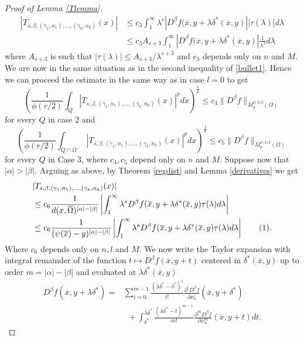\documentclass[12pt]{article}
\theoremstyle{definition}
\newcommand\addtag{\refstepcounter{equation}\tag{\theequation}}
\begin{document}
\begin{proof}[Proof of Lemma \ref{Tlemma}]
\begin{align*}
 |T_{s,\beta,(\gamma_1,n_1),...,(\gamma_k,n_k)}(x) | &\le c_3 \int_1^\infty\lambda^s |D^\beta f(\overline x, y+\lambda \delta^*(\overline x, y)| |\tau(\lambda)|d\lambda \\
&\le c_3A_{s+3} \int_1^\infty|D^\beta f(\overline x, y+\lambda \delta^*(\overline x, y)| \frac{1}{\lambda^3}d\lambda
\end{align*}
where  $A_{s+3}$ is such that $|\tau(\lambda)|\le A_{s+3}/\lambda^{s+3}$ and  $c_3$ depends only  on $n$ and $M.$ We are now in the same situation as in the second inequality of \eqref{bullet1}. Hence we can proceed the estimate in the same way as in case $l=0$ to get 
\[\left( \frac{1}{\phi(r/2)}\int_Q  \left| T_{s,\beta,(\gamma_1,n_1),...,(\gamma_k,n_k)}(x)\right|^p dx\right )^{\frac{1}{p}} \le c_4 \| D^\beta f \|_{M_p^{\phi,\delta/2}(\Omega)} \] 
for every $Q$ in case 2 and
\[\left( \frac{1}{\phi(r/2)}\int_{Q \cap \Omega^-}  \left| T_{s,\beta,(\gamma_1,n_1),...,(\gamma_k,n_k)}(x)\right|^p dx\right )^{\frac{1}{p}} \le c_5 \| D^\beta f \|_{M_p^{\phi,\delta/2}(\Omega)} \] 
 for every $Q$ in Case 3, where $c_4,c_5$ depend only on $n$ and $M.$
Suppose now that $|\alpha|>|\beta|.$ Arguing as above, by Theorem \ref{regdist} and Lemma \ref{derivatives} we get
\begin{align*}
&|T_{s,\beta,(\gamma_1,n_1),...,(\gamma_k,n_k)}(x) | \\
&\le c_6 \frac{1}{d(x,\overline \Omega)^{|\alpha|-|\beta|}} \left|\int_1^\infty \lambda^sD^\beta f(\overline x, y+\lambda \delta^*(\overline x, y)\tau(\lambda)d\lambda \right| \\
& \le  c_6 \frac{1}{(\psi(\overline x)-y)^{|\alpha|-|\beta|}} \left |\int_1^\infty \lambda^s D^\beta f(\overline x, y+\lambda \delta^*(\overline x, y) \tau(\lambda)d\lambda \right |\addtag \label{zzz} .   
\end{align*}
Where $c_6$ depends only on $n,l$ and $M$. We now write the Taylor expansion with integral remainder of the function $t \mapsto D^\beta f(\overline x, y+t)$ centered in $\delta^*(\overline x,y)$ up to order $m=|\alpha|-|\beta|$ and evaluated at $\lambda \delta^*(\overline x,y)$
\begin{align*}
D^\beta f(\overline x, y+\lambda \delta^*) = &\sum_{i=0}^{m-1} \frac{(\lambda \delta^*-\delta^*)^i}{i!}\frac{\partial^i D^\beta f}{\partial x_n^i}(\overline x,y+\delta^*) \\
&\ \ +\int_{\delta^*}^{\lambda \delta^*} \frac{(\lambda \delta^*-t)^{m-1}}{m!}\frac{\partial^{m} D^\beta f}{\partial x_n^{m} }(\overline x,y+t)dt. 

\end{align*}
\end{proof}
\end{document}
